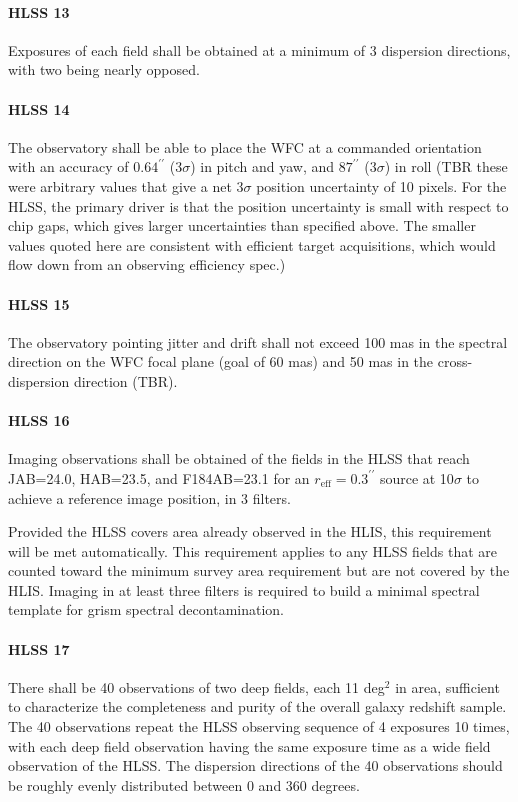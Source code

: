 \paragraph{HLSS 13} Exposures of each field shall be obtained at a minimum of 3 dispersion directions, with two being nearly opposed.

\paragraph{HLSS 14} The observatory shall be able to place the WFC at a commanded
 orientation with an accuracy of $0.64^{\prime\prime}$ ($3\sigma$) in pitch and yaw, and $87^{\prime\prime}$ ($3\sigma$) in
 roll (TBR these were arbitrary values that give a net $3\sigma$ position uncertainty
 of 10 pixels. For the HLSS, the primary driver is that the position uncertainty
 is small with respect to chip gaps, which gives larger uncertainties than
 specified above. The smaller values quoted here are consistent with efficient
 target acquisitions, which would flow down from an observing efficiency spec.)

\paragraph{HLSS 15} The observatory pointing jitter and drift shall not exceed 100 mas in the spectral direction on the WFC focal plane (goal of 60 mas) and 50 mas in the cross- dispersion direction (TBR).

\paragraph{HLSS 16} Imaging observations shall be obtained of the fields in the HLSS that reach JAB=24.0, HAB=23.5, and F184AB=23.1 for an $r_\mathrm{eff}=0.3^{\prime\prime}$
 source at 10$\sigma$ to achieve a reference image position, in 3 filters.

 Provided the HLSS covers area already observed in the HLIS, this
 requirement will be met automatically.  This requirement applies to any HLSS
 fields that are counted toward the minimum survey area requirement but are not
 covered by the HLIS.  Imaging in at least three filters is required to build a
 minimal spectral template for grism spectral decontamination.

\paragraph{HLSS 17} There shall be 40 observations of two deep fields, each 11 deg$^2$ in area, sufficient to characterize the completeness and purity of the overall galaxy redshift sample. The 40 observations repeat the HLSS observing sequence of 4 exposures 10 times, with each deep field observation having the same exposure time as a wide field observation of the HLSS. The dispersion directions of the 40 observations should be roughly evenly distributed between 0 and 360 degrees.

